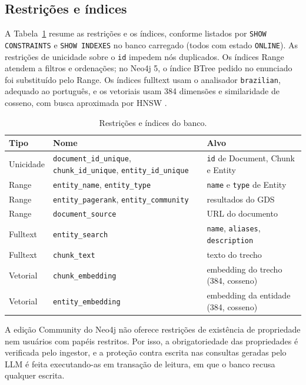 \documentclass[12pt]{article}
\begin{document}
\subsection{Restrições e índices}

A Tabela~\ref{tab:indices} resume as restrições e os índices, conforme listados por
\texttt{SHOW CONSTRAINTS} e \texttt{SHOW INDEXES} no banco carregado (todos com estado
\texttt{ONLINE}). As restrições de unicidade sobre o \texttt{id} impedem nós duplicados.
Os índices Range atendem a filtros e ordenações; no Neo4j 5, o índice BTree pedido no
enunciado foi substituído pelo Range. Os índices fulltext usam o analisador
\texttt{brazilian}, adequado ao português, e os vetoriais usam 384 dimensões e
similaridade de cosseno, com busca aproximada por HNSW \cite{malkov2020hnsw}.

\begin{table}[ht]
\centering
\caption{Restrições e índices do banco.}
\label{tab:indices}
\footnotesize
\begin{tabular}{l>{\raggedright\arraybackslash}p{5.4cm}>{\raggedright\arraybackslash}p{4.2cm}}
\toprule
\textbf{Tipo} & \textbf{Nome} & \textbf{Alvo} \\
\midrule
Unicidade & \texttt{document\_id\_unique}, \texttt{chunk\_id\_unique}, \texttt{entity\_id\_unique} & \texttt{id} de Document, Chunk e Entity \\
Range & \texttt{entity\_name}, \texttt{entity\_type} & \texttt{name} e \texttt{type} de Entity \\
Range & \texttt{entity\_pagerank}, \texttt{entity\_community} & resultados do GDS \\
Range & \texttt{document\_source} & URL do documento \\
Fulltext & \texttt{entity\_search} & \texttt{name}, \texttt{aliases}, \texttt{description} \\
Fulltext & \texttt{chunk\_text} & texto do trecho \\
Vetorial & \texttt{chunk\_embedding} & embedding do trecho (384, cosseno) \\
Vetorial & \texttt{entity\_embedding} & embedding da entidade (384, cosseno) \\
\bottomrule
\end{tabular}
\end{table}

A edição Community do Neo4j não oferece restrições de existência de propriedade nem
usuários com papéis restritos. Por isso, a obrigatoriedade das propriedades é verificada
pelo ingestor, e a proteção contra escrita nas consultas geradas pelo LLM é feita
executando-as em transação de leitura, em que o banco recusa qualquer escrita.
\end{document}
